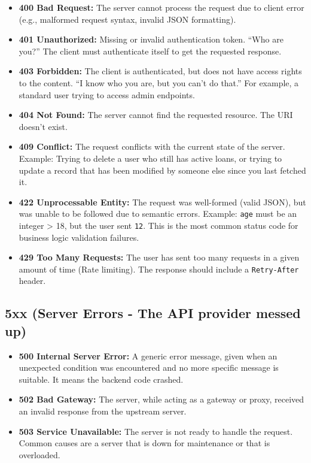 \begin{itemize}
\tightlist
\item
  \textbf{400 Bad Request:} The server cannot process the request due to
  client error (e.g., malformed request syntax, invalid JSON
  formatting).
\item
  \textbf{401 Unauthorized:} Missing or invalid authentication token.
  ``Who are you?'' The client must authenticate itself to get the
  requested response.
\item
  \textbf{403 Forbidden:} The client is authenticated, but does not have
  access rights to the content. ``I know who you are, but you can't do
  that.'' For example, a standard user trying to access admin endpoints.
\item
  \textbf{404 Not Found:} The server cannot find the requested resource.
  The URI doesn't exist.
\item
  \textbf{409 Conflict:} The request conflicts with the current state of
  the server. Example: Trying to delete a user who still has active
  loans, or trying to update a record that has been modified by someone
  else since you last fetched it.
\item
  \textbf{422 Unprocessable Entity:} The request was well-formed (valid
  JSON), but was unable to be followed due to semantic errors. Example:
  \texttt{age} must be an integer \textgreater{} 18, but the user sent
  \texttt{12}. This is the most common status code for business logic
  validation failures.
\item
  \textbf{429 Too Many Requests:} The user has sent too many requests in
  a given amount of time (Rate limiting). The response should include a
  \texttt{Retry-After} header.
\end{itemize}

\subsection{5xx (Server Errors - The API provider messed
up)}\label{xx-server-errors---the-api-provider-messed-up}

\begin{itemize}
\tightlist
\item
  \textbf{500 Internal Server Error:} A generic error message, given
  when an unexpected condition was encountered and no more specific
  message is suitable. It means the backend code crashed.
\item
  \textbf{502 Bad Gateway:} The server, while acting as a gateway or
  proxy, received an invalid response from the upstream server.
\item
  \textbf{503 Service Unavailable:} The server is not ready to handle
  the request. Common causes are a server that is down for maintenance
  or that is overloaded.
\end{itemize}

